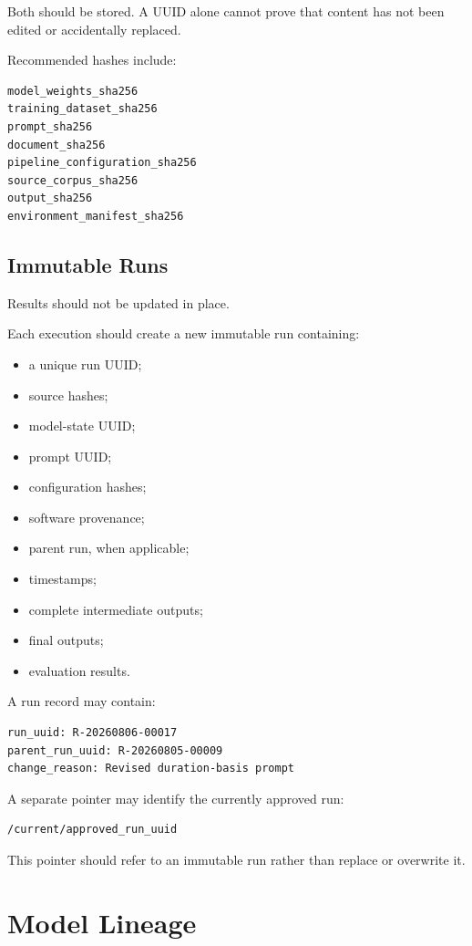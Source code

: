 \documentclass[11pt]{report}
\begin{document}
Both should be stored. A UUID alone cannot prove that content has not been edited or accidentally replaced.

Recommended hashes include:

\begin{verbatim}
model_weights_sha256
training_dataset_sha256
prompt_sha256
document_sha256
pipeline_configuration_sha256
source_corpus_sha256
output_sha256
environment_manifest_sha256
\end{verbatim}

\section{Immutable Runs}

Results should not be updated in place.

Each execution should create a new immutable run containing:

\begin{itemize}
  \item a unique run UUID;
  \item source hashes;
  \item model-state UUID;
  \item prompt UUID;
  \item configuration hashes;
  \item software provenance;
  \item parent run, when applicable;
  \item timestamps;
  \item complete intermediate outputs;
  \item final outputs;
  \item evaluation results.
\end{itemize}

A run record may contain:

\begin{verbatim}
run_uuid: R-20260806-00017
parent_run_uuid: R-20260805-00009
change_reason: Revised duration-basis prompt
\end{verbatim}

A separate pointer may identify the currently approved run:

\begin{verbatim}
/current/approved_run_uuid
\end{verbatim}

This pointer should refer to an immutable run rather than replace or overwrite it.

\chapter{Model Lineage}
\end{document}
